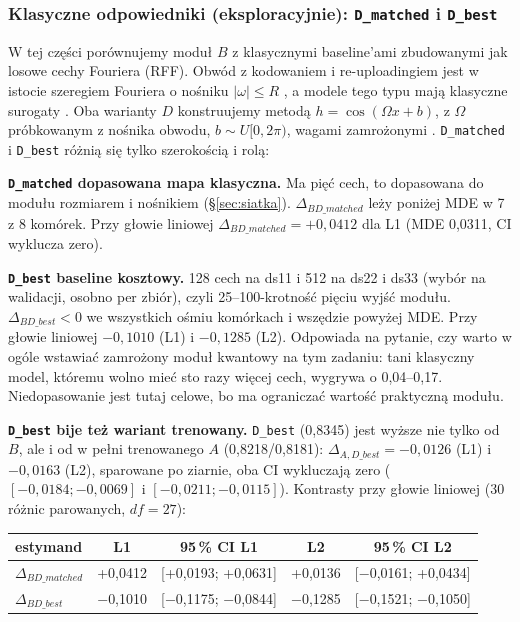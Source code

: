 \documentclass[11pt, a4paper]{article}
\begin{document}
\subsubsection{Klasyczne odpowiedniki (eksploracyjnie): \texttt{D\_matched} i \texttt{D\_best}}

W tej części porównujemy moduł $B$ z klasycznymi baseline'ami zbudowanymi jak losowe cechy Fouriera (RFF). Obwód z kodowaniem i re-uploadingiem jest w istocie szeregiem Fouriera o nośniku $|\omega| \le R$ \citep{schuld2021}, a modele tego typu mają klasyczne surogaty \citep{schreiber2023}. Oba warianty $D$ konstruujemy metodą $h = \cos(\Omega x + b)$, z $\Omega$ próbkowanym z nośnika obwodu, $b \sim U[0,2\pi)$, wagami zamrożonymi \citep{landman2022, sweke2025}. \texttt{D\_matched} i \texttt{D\_best} różnią się tylko szerokością i rolą:

\textbf{\texttt{D\_matched} dopasowana mapa klasyczna.} Ma pięć cech, to dopasowana do modułu rozmiarem i nośnikiem (\S\ref{sec:siatka}). $\Delta_{BD\_matched}$ leży poniżej MDE w 7 z 8 komórek. Przy głowie liniowej $\Delta_{BD\_matched} = +0{,}0412$ dla L1 (MDE 0,0311, CI wyklucza zero).

\textbf{\texttt{D\_best} baseline kosztowy.} 128 cech na ds11 i 512 na ds22 i ds33 (wybór na walidacji, osobno per zbiór), czyli 25--100-krotność pięciu wyjść modułu. $\Delta_{BD\_best} < 0$ we wszystkich ośmiu komórkach i wszędzie powyżej MDE. Przy głowie liniowej $-0{,}1010$ (L1) i $-0{,}1285$ (L2). Odpowiada na pytanie, czy warto w ogóle wstawiać zamrożony moduł kwantowy na tym zadaniu: tani klasyczny model, któremu wolno mieć sto razy więcej cech, wygrywa o 0,04--0,17. Niedopasowanie jest tutaj celowe, bo ma ograniczać wartość praktyczną modułu.

\textbf{\texttt{D\_best} bije też wariant trenowany.} \texttt{D\_best} (0,8345) jest wyższe nie tylko od $B$, ale i od w pełni trenowanego $A$ (0,8218/0,8181): $\Delta_{A,D\_best} = -0{,}0126$ (L1) i $-0{,}0163$ (L2), sparowane po ziarnie, oba CI wykluczają zero ($[-0{,}0184;-0{,}0069]$ i $[-0{,}0211;-0{,}0115]$).
Kontrasty przy głowie liniowej (30 różnic parowanych, $df = 27$):

\begin{table}[H]
\centering
\renewcommand{\arraystretch}{1.3}
\begin{tabular}{lcccc}
\toprule
\textbf{estymand} & \textbf{L1} & \textbf{95\,\% CI L1} & \textbf{L2} & \textbf{95\,\% CI L2} \\
\midrule
$\Delta_{BD\_matched}$ & +0,0412 & [+0,0193; +0,0631] & +0,0136 & [$-$0,0161; +0,0434] \\
$\Delta_{BD\_best}$ & $-$0,1010 & [$-$0,1175; $-$0,0844] & $-$0,1285 & [$-$0,1521; $-$0,1050] \\
\bottomrule
\end{tabular}
\end{table}
\end{document}
